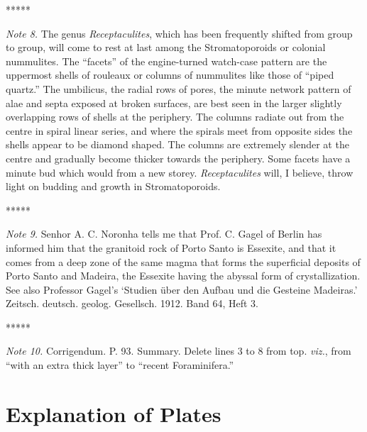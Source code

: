 \documentclass[a4paper, 12pt, oneside]{article}
\begin{document}
\centerline{*\hspace{15mm}*\hspace{15mm}*\hspace{15mm}*\hspace{15mm}*}
\bigskip

\emph{Note 8.} The genus \emph{Receptaculites}, which has been frequently shifted from group to group, will come to rest at last among the Stromatoporoids or colonial nummulites. The ``facets'' of the engine-turned watch-case pattern are the uppermost shells of rouleaux or columns of nummulites like those of ``piped quartz.'' The umbilicus, the radial rows of pores, the minute network pattern of alae and septa exposed at broken surfaces, are best seen in the larger slightly overlapping rows of shells at the periphery. The columns radiate out from the centre in spiral linear series, and where the spirals meet from opposite sides the shells appear to be diamond shaped. The columns are extremely slender at the centre and gradually become thicker towards the periphery. Some facets have a minute bud which would from a new storey. \emph{Receptaculites} will, I believe, throw light on budding and growth in Stromatoporoids.

\centerline{*\hspace{15mm}*\hspace{15mm}*\hspace{15mm}*\hspace{15mm}*}
\bigskip

\emph{Note 9.} Senhor A. C. Noronha tells me that Prof. C. Gagel of Berlin has informed him that the granitoid rock of Porto Santo is Essexite, and that it comes from a deep zone of the same magma that forms the superficial deposits of Porto Santo and Madeira, the Essexite having the abyssal form of crystallization. See also Professor Gagel's `Studien über den Aufbau und die Gesteine Madeiras.' Zeitsch. deutsch. geolog. Gesellsch. 1912. Band 64, Heft 3.

\centerline{*\hspace{15mm}*\hspace{15mm}*\hspace{15mm}*\hspace{15mm}*}
\bigskip

\emph{Note 10.} Corrigendum. P. 93. Summary. Delete lines 3 to 8 from top. \emph{viz.}, from ``with an extra thick layer'' to ``recent Foraminifera.''
\clearpage
\section{Explanation of Plates}
\end{document}
